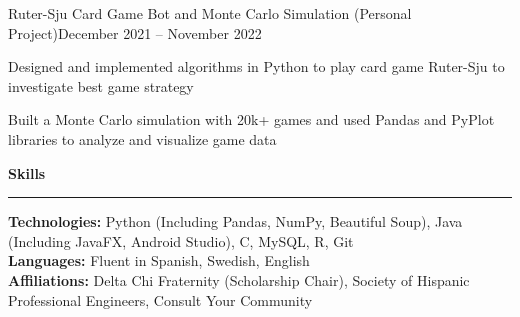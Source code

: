 \documentclass{article}
\newcommand{\horizontal}{\vspace{2pt}\hrule}
\newcommand{\sectitle}[1]{\vspace{2pt} \textbf{\large #1} \horizontal}
\newcommand{\skill}[2]{\textbf{#1:} #2}
\begin{document}
\begin{flushleft}
    \begin{subexperience}{Ruter-Sju Card Game Bot and Monte Carlo Simulation (Personal Project)}{December 2021 -- November 2022}
        \item Designed and implemented algorithms in Python to play card game Ruter-Sju to investigate best game strategy
        \item Built a Monte Carlo simulation with 20k+ games and used Pandas and PyPlot libraries to analyze and visualize game data
    \end{subexperience}

\sectitle{Skills}

    \vspace{3pt}
    \skill{Technologies}{Python (Including Pandas, NumPy, Beautiful Soup), Java (Including JavaFX, Android Studio), C, MySQL, R, Git} \\
    \skill{Languages}{Fluent in Spanish, Swedish, English} \\
    \skill{Affiliations}{Delta Chi Fraternity (Scholarship Chair), Society of Hispanic Professional Engineers, Consult Your Community}

\end{flushleft}
\end{document}
